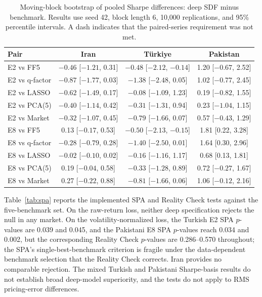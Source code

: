 \documentclass[12pt]{article}
\begin{document}
\begin{table}[htbp]
\centering
\caption{Moving-block bootstrap of pooled Sharpe differences: deep SDF minus benchmark. Results use seed 42, block length 6, 10,000 replications, and 95\% percentile intervals. A dash indicates that the paired-series requirement was not met.}
\label{tab:boot}
\scriptsize
\setlength{\tabcolsep}{2.5pt}
\begin{tabular}{l ccc}
\toprule
Pair & Iran & T\"urkiye & Pakistan \\
\midrule
E2 vs FF5 & $-0.46$ [$-1.21$, 0.31] & $-0.48$ [$-2.12$, $-0.14$] & 1.20 [$-0.67$, 2.52] \\
E2 vs q-factor & $-0.87$ [$-1.77$, 0.03] & $-1.38$ [$-2.48$, 0.05] & 1.02 [$-0.77$, 2.45] \\
E2 vs LASSO & $-0.62$ [$-1.49$, 0.17] & $-0.08$ [$-1.09$, 1.23] & 0.19 [$-0.82$, 1.55] \\
E2 vs PCA(5) & $-0.40$ [$-1.14$, 0.42] & $-0.31$ [$-1.31$, 0.94] & 0.23 [$-1.04$, 1.15] \\
E2 vs Market & $-0.32$ [$-1.07$, 0.45] & $-0.79$ [$-1.66$, 0.07] & 0.57 [$-0.43$, 1.29] \\
E8 vs FF5 & 0.13 [$-0.17$, 0.53] & $-0.50$ [$-2.13$, $-0.15$] & 1.81 [0.22, 3.28] \\
E8 vs q-factor & $-0.28$ [$-0.79$, 0.28] & $-1.40$ [$-2.50$, 0.01] & 1.64 [0.30, 2.96] \\
E8 vs LASSO & $-0.02$ [$-0.10$, 0.02] & $-0.16$ [$-1.16$, 1.17] & 0.68 [0.13, 1.81] \\
E8 vs PCA(5) & 0.19 [$-0.04$, 0.58] & $-0.33$ [$-1.28$, 0.89] & 0.72 [$-0.27$, 1.67] \\
E8 vs Market & 0.27 [$-0.22$, 0.88] & $-0.81$ [$-1.66$, 0.06] & 1.06 [$-0.12$, 2.16] \\
\bottomrule
\end{tabular}
\end{table}

Table~\ref{tab:spa} reports the implemented SPA and Reality Check tests against the five-benchmark set. On the raw-return loss, neither deep specification rejects the null in any market. On the volatility-normalized loss, the Turkish E2 SPA $p$-values are 0.039 and 0.045, and the Pakistani E8 SPA $p$-values reach 0.034 and 0.002, but the corresponding Reality Check $p$-values are 0.286--0.570 throughout; the SPA's single-best-benchmark criterion is fragile under the data-dependent benchmark selection that the Reality Check corrects. Iran provides no comparable rejection. The mixed Turkish and Pakistani Sharpe-basis results do not establish broad deep-model superiority, and the tests do not apply to RMS pricing-error differences.
\end{document}

